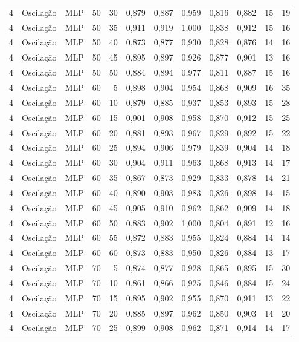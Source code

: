 \begin{longtable}{@{}rllrrrrrrrrr@{}}
4 & Oscilação & MLP & 50 & 30 & 0,879 & 0,887 & 0,959 & 0,816 & 0,882 & 15 & 19 \\
4 & Oscilação & MLP & 50 & 35 & 0,911 & 0,919 & 1,000 & 0,838 & 0,912 & 15 & 16 \\
4 & Oscilação & MLP & 50 & 40 & 0,873 & 0,877 & 0,930 & 0,828 & 0,876 & 14 & 16 \\
4 & Oscilação & MLP & 50 & 45 & 0,895 & 0,897 & 0,926 & 0,877 & 0,901 & 13 & 16 \\
4 & Oscilação & MLP & 50 & 50 & 0,884 & 0,894 & 0,977 & 0,811 & 0,887 & 15 & 16 \\
4 & Oscilação & MLP & 60 & 5 & 0,898 & 0,904 & 0,954 & 0,868 & 0,909 & 16 & 35 \\
4 & Oscilação & MLP & 60 & 10 & 0,879 & 0,885 & 0,937 & 0,853 & 0,893 & 15 & 28 \\
4 & Oscilação & MLP & 60 & 15 & 0,901 & 0,908 & 0,958 & 0,870 & 0,912 & 15 & 25 \\
4 & Oscilação & MLP & 60 & 20 & 0,881 & 0,893 & 0,967 & 0,829 & 0,892 & 15 & 22 \\
4 & Oscilação & MLP & 60 & 25 & 0,894 & 0,906 & 0,979 & 0,839 & 0,904 & 14 & 18 \\
4 & Oscilação & MLP & 60 & 30 & 0,904 & 0,911 & 0,963 & 0,868 & 0,913 & 14 & 17 \\
4 & Oscilação & MLP & 60 & 35 & 0,867 & 0,873 & 0,929 & 0,833 & 0,878 & 14 & 21 \\
4 & Oscilação & MLP & 60 & 40 & 0,890 & 0,903 & 0,983 & 0,826 & 0,898 & 14 & 15 \\
4 & Oscilação & MLP & 60 & 45 & 0,905 & 0,910 & 0,962 & 0,862 & 0,909 & 14 & 18 \\
4 & Oscilação & MLP & 60 & 50 & 0,883 & 0,902 & 1,000 & 0,804 & 0,891 & 12 & 16 \\
4 & Oscilação & MLP & 60 & 55 & 0,872 & 0,883 & 0,955 & 0,824 & 0,884 & 14 & 14 \\
4 & Oscilação & MLP & 60 & 60 & 0,873 & 0,883 & 0,950 & 0,826 & 0,884 & 13 & 17 \\
4 & Oscilação & MLP & 70 & 5 & 0,874 & 0,877 & 0,928 & 0,865 & 0,895 & 15 & 30 \\
4 & Oscilação & MLP & 70 & 10 & 0,861 & 0,866 & 0,925 & 0,846 & 0,884 & 15 & 24 \\
4 & Oscilação & MLP & 70 & 15 & 0,895 & 0,902 & 0,955 & 0,870 & 0,911 & 13 & 22 \\
4 & Oscilação & MLP & 70 & 20 & 0,885 & 0,897 & 0,962 & 0,850 & 0,903 & 14 & 20 \\
4 & Oscilação & MLP & 70 & 25 & 0,899 & 0,908 & 0,962 & 0,871 & 0,914 & 14 & 17 \\

\end{longtable}
